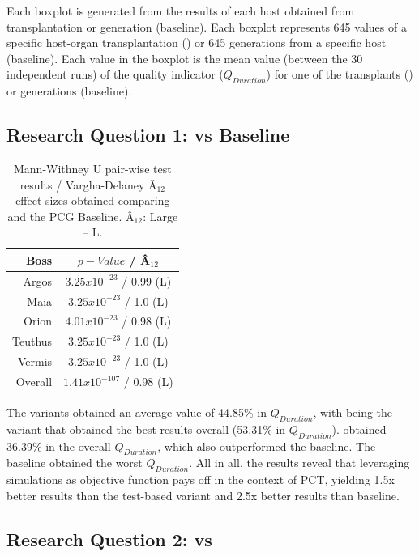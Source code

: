 Each boxplot is generated from the results of each host obtained from transplantation \ApproachName{} or generation (baseline). Each boxplot represents 645 values of a specific host-organ transplantation (\ApproachName{}) or 645 generations from a specific host (baseline). Each value in the boxplot is the mean value (between the 30 independent runs) of the quality indicator ($Q_{Duration}$) for one of the transplants (\ApproachName{}) or generations (baseline).

\subsection{Research Question 1: \simhotep{} vs Baseline}

\begin{table}[ht!]
    \centering
    \caption{Mann-Withney U pair-wise test results / Vargha-Delaney Â$_{12}$ effect sizes obtained comparing \simhotep{} and the PCG Baseline. Â$_{12}$: Large -- L.}
    \label{tab:results_rq1}
    \begin{tabular}{@{}rc@{}}
    \toprule
    Boss    & $p-Value$ / Â$_{12}$           \\ \midrule 
    Argos   & $3.25x10^{-23}$  / 0.99 (L)    \\
    Maia    & $3.25x10^{-23}$  /  1.0 (L)    \\
    Orion   & $4.01x10^{-23}$  / 0.98 (L)    \\
    Teuthus & $3.25x10^{-23}$  /  1.0 (L)    \\
    Vermis  & $3.25x10^{-23}$  /  1.0 (L)    \\
    Overall & $1.41x10^{-107}$ / 0.98 (L)    \\
    \bottomrule
    \end{tabular}
    \end{table}

The variants obtained an average value of 44.85\% in $Q_{Duration}$, with \simhotep{} being the variant that obtained the best results overall (53.31\% in $Q_{Duration}$). \timhotep obtained 36.39\% in the overall $Q_{Duration}$, which also outperformed the baseline. The baseline obtained the worst $Q_{Duration}$. All in all, the results reveal that leveraging simulations as objective function pays off in the context of PCT, yielding 1.5x better results than the test-based variant and 2.5x better results than baseline.

\subsection{Research Question 2: \simhotep{} vs \timhotep{}}

